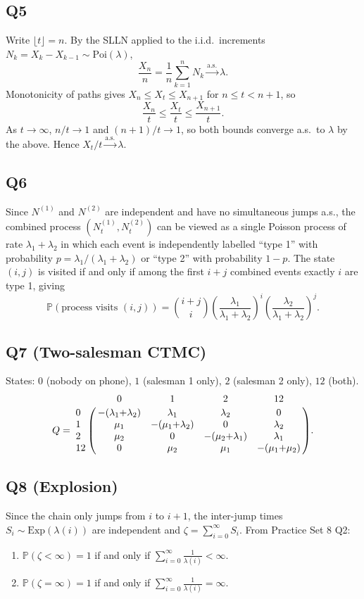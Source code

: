 \documentclass[11pt]{article}
\newcommand{\PP}{\mathbb{P}}
\newcommand{\1}{\mathbf{1}}
\begin{document}
\subsection*{Q5}
Write $\lfloor t\rfloor=n$.  By the SLLN applied to the i.i.d.\ increments $N_k=X_k-X_{k-1}\sim\mathrm{Poi}(\lambda)$,
\[
\frac{X_n}{n}=\frac{1}{n}\sum_{k=1}^n N_k\xrightarrow{\text{a.s.}}\lambda.
\]
Monotonicity of paths gives $X_n\le X_t\le X_{n+1}$ for $n\le t<n+1$, so
\[
\frac{X_n}{t}\le\frac{X_t}{t}\le\frac{X_{n+1}}{t}.
\]
As $t\to\infty$, $n/t\to1$ and $(n+1)/t\to1$, so both bounds converge a.s.\ to $\lambda$ by the above.  Hence $X_t/t\xrightarrow{\text{a.s.}}\lambda$.

\subsection*{Q6}
Since $N^{(1)}$ and $N^{(2)}$ are independent and have no simultaneous jumps a.s., the combined process $(N^{(1)}_t,N^{(2)}_t)$ can be viewed as a single Poisson process of rate $\lambda_1+\lambda_2$ in which each event is independently labelled ``type 1'' with probability $p=\lambda_1/(\lambda_1+\lambda_2)$ or ``type 2'' with probability $1-p$.  The state $(i,j)$ is visited if and only if among the first $i+j$ combined events exactly $i$ are type 1, giving
\[
\PP\!\left(\text{process visits }(i,j)\right)=\binom{i+j}{i}\left(\frac{\lambda_1}{\lambda_1+\lambda_2}\right)^i\!\left(\frac{\lambda_2}{\lambda_1+\lambda_2}\right)^j.
\]

\subsection*{Q7 (Two-salesman CTMC)}
States: $0$ (nobody on phone), $1$ (salesman 1 only), $2$ (salesman 2 only), $12$ (both).
\[
Q=\bordermatrix{
 & 0 & 1 & 2 & 12 \cr
0 & -(\lambda_1{+}\lambda_2) & \lambda_1 & \lambda_2 & 0 \cr
1 & \mu_1 & -(\mu_1{+}\lambda_2) & 0 & \lambda_2 \cr
2 & \mu_2 & 0 & -(\mu_2{+}\lambda_1) & \lambda_1 \cr
12 & 0 & \mu_2 & \mu_1 & -(\mu_1{+}\mu_2)
}.
\]

\subsection*{Q8 (Explosion)}
Since the chain only jumps from $i$ to $i+1$, the inter-jump times $S_i\sim\mathrm{Exp}(\lambda(i))$ are independent and $\zeta=\sum_{i=0}^\infty S_i$.  From Practice Set 8 Q2:
\begin{enumerate}[label=(\roman*)]
\item $\PP(\zeta<\infty)=1$ if and only if $\displaystyle\sum_{i=0}^\infty\frac{1}{\lambda(i)}<\infty$.
\item $\PP(\zeta=\infty)=1$ if and only if $\displaystyle\sum_{i=0}^\infty\frac{1}{\lambda(i)}=\infty$.
\end{enumerate}
\end{document}
